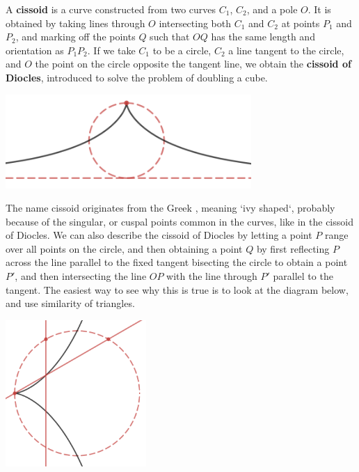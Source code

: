 \begin{example}
    A {\bf cissoid} is a curve constructed from two curves $C_1$, $C_2$, and a pole $O$. It is obtained by taking lines through $O$ intersecting both $C_1$ and $C_2$ at points $P_1$ and $P_2$, and marking off the points $Q$ such that $OQ$ has the same length and orientation as $P_1P_2$. If we take $C_1$ to be a circle, $C_2$ a line tangent to the circle, and $O$ the point on the circle opposite the tangent line, we obtain the {\bf cissoid of Diocles}, introduced to solve the problem of doubling a cube.
    \begin{center}
    \includegraphics[width=0.7\textwidth]{algebraicGeometryCissoidDiocles}
    \end{center}
    The name cissoid originates from the Greek \textkappa \textiota \textsigma \textsigma \textomikron \textepsilon \textiota \textdelta \texteta \textvarsigma, meaning `ivy shaped`, probably because of the singular, or cuspal points common in the curves, like in the cissoid of Diocles. We can also describe the cissoid of Diocles by letting a point $P$ range over all points on the circle, and then obtaining a point $Q$ by first reflecting $P$ across the line parallel to the fixed tangent bisecting the circle to obtain a point $P'$, and then intersecting the line $OP$ with the line through $P'$ parallel to the tangent. The easiest way to see why this is true is to look at the diagram below, and use similarity of triangles.
    \begin{center}
        \includegraphics[width=0.4\textwidth]{algebraicGeometryCissoidDiocles2}
    \end{center}

\end{example}
